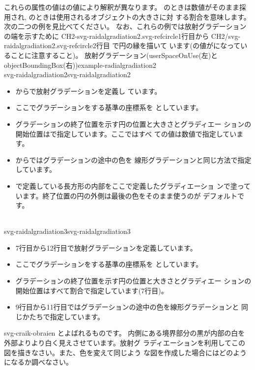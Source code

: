 これらの属性の値はの値により解釈が異なります。
のときは数値がそのまま採用され, 
のときは使用されるオブジェクトの大きさに対
する割合を意味します。次の二つの例を見比べてください。
なお、これらの例では放射グラデーションの端を示すために
\csname CH2-svg-raidalgradiation2.svg-refcircle1\endcsname 行目から
\csname CH2/svg-raidalgradiation2.svg-refcircle2\endcsname 行目
で円の縁を描いて
います(の値がになっていることに注意すること)。
    {放射グラデーション(userSpaceOnUse(左)とobjectBoundingBox(右))}{example-radialgradiation2}
\vspace{-1.5\baselineskip}\\
  {svg-raidalgradiation2}{svg-raidalgradiation2}
\begin{itemize}
 \item {}からで放射グラデーションを定義し
       ています。
 \item ここでグラデーションをする基準の座標系を
       としています。
 \item グラデーションの終了位置を示す円の位置と大きさとグラディエー
       ションの開始位置はで指定しています。ここではすべ
       ての値は数値で指定しています。
 \item {}からではグラデーションの途中の色を
       線形グラデーションと同じ方法で指定しています。
 \item {}で定義している長方形の内部をここで定義したグラディエーショ
       ンで塗っています。終了位置の円の外側は最後の色をそのまま使うのが
       デフォルトです。
\end{itemize}
\ \vspace{-2.5\baselineskip}\\
  {svg-raidalgradiation3}{svg-raidalgradiation3}
\begin{itemize}
 \item 7行目から12行目で放射グラデーションを定義しています。
 \item ここでグラデーションをする基準の座標系を
       としています。
 \item グラデーションの終了位置を示す円の位置と大きさとグラディエー
       ションの開始位置はすべて割合で指定しています(7行目)。
 \item 9行目から11行目ではグラデーションの途中の色を線形グラデーションと
       同じかたちで指定しています。
\end{itemize}
{svg-craik-obraien}
{とよばれるものです。
内側にある境界部分の黒が内部の白を外部よりより白く見えさせています。放射グ
 ラディエーションを利用してこの図を描きなさい。また、色を変えて同じよう
 な図を作成した場合にはどのようになるか調べなさい。}

